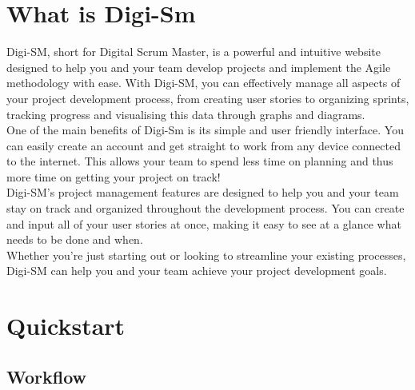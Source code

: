 \documentclass{article}
\begin{document}
\section{What is Digi-Sm}

Digi-SM, short for Digital Scrum Master, is a powerful and intuitive website designed to help you and your team develop projects and implement the Agile methodology with ease. With Digi-SM, you can effectively manage all aspects of your project development process, from creating user stories to organizing sprints, tracking progress and visualising this data through graphs and diagrams.\\

One of the main benefits of Digi-Sm is its simple and user friendly interface. You can easily create an account and get straight to work from any device connected to the internet. This allows your team to spend less time on planning and thus more time on getting your project on track! \\

Digi-SM's project management features are designed to help you and your team stay on track and organized throughout the development process. You can create and input all of your user stories at once, making it easy to see at a glance what needs to be done and when.\\

Whether you're just starting out or looking to streamline your existing processes, Digi-SM can help you and your team achieve your project development goals.\\



\newpage


\section{Quickstart}\label{quickstart}



\subsection{Workflow}
\end{document}
